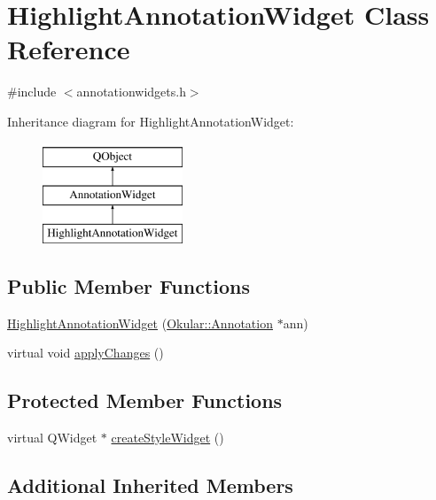 \hypertarget{classHighlightAnnotationWidget}{\section{Highlight\+Annotation\+Widget Class Reference}
\label{classHighlightAnnotationWidget}
}


{\ttfamily \#include $<$annotationwidgets.\+h$>$}

Inheritance diagram for Highlight\+Annotation\+Widget\+:\begin{figure}[H]
\begin{center}
\leavevmode
\includegraphics[height=3.000000cm]{classHighlightAnnotationWidget}
\end{center}
\end{figure}
\subsection*{Public Member Functions}
\begin{DoxyCompactItemize}
\item 
\hyperlink{classHighlightAnnotationWidget_a74283fa43e68ef7d60daef6748873790}{Highlight\+Annotation\+Widget} (\hyperlink{classOkular_1_1Annotation}{Okular\+::\+Annotation} $\ast$ann)
\item 
virtual void \hyperlink{classHighlightAnnotationWidget_a10838667b738e48983922d4c281a0410}{apply\+Changes} ()
\end{DoxyCompactItemize}
\subsection*{Protected Member Functions}
\begin{DoxyCompactItemize}
\item 
virtual Q\+Widget $\ast$ \hyperlink{classHighlightAnnotationWidget_a95a625155164522bb33b98e466d4e957}{create\+Style\+Widget} ()
\end{DoxyCompactItemize}
\subsection*{Additional Inherited Members}


